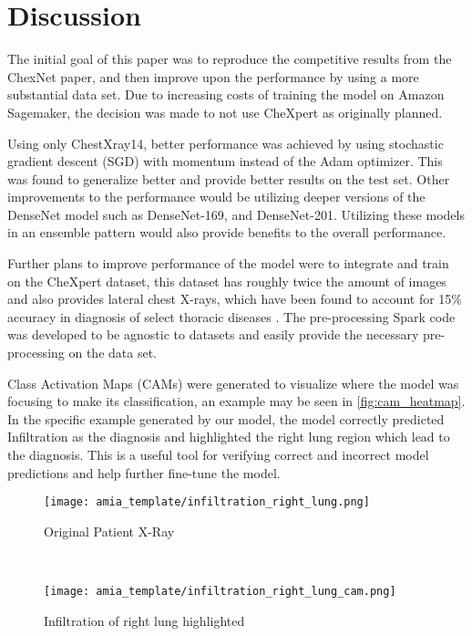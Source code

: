 \documentclass{amia}
\begin{document}
\section*{Discussion}

The initial goal of this paper was to reproduce the competitive results from the ChexNet paper, and then improve upon the performance by using a more substantial data set. Due to increasing costs of training the model on Amazon Sagemaker, the decision was made to not use CheXpert as originally planned.

Using only ChestXray14, better performance was achieved by using stochastic gradient descent (SGD) with momentum instead of the Adam optimizer. This was found to generalize better \cite{ref13} and provide better results on the test set. Other improvements to the performance would be utilizing deeper versions of the DenseNet model such as DenseNet-169, and DenseNet-201. Utilizing these models in an ensemble pattern would also provide benefits to the overall performance.

Further plans to improve performance of the model were to integrate and train on the CheXpert dataset, this dataset has roughly twice the amount of images and also provides lateral chest X-rays, which have been found to account for 15\% accuracy in diagnosis of select thoracic diseases \cite{ref10}. The pre-processing Spark code was developed to be agnostic to datasets and easily provide the necessary pre-processing on the data set.

Class Activation Maps (CAMs)\cite{ref11} were generated to visualize where the model was focusing to make its classification, an example may be seen in \ref{fig:cam_heatmap}. In the specific example generated by our model, the model correctly predicted Infiltration as the diagnosis and highlighted the right lung region which lead to the diagnosis. This is a useful tool for verifying correct and incorrect model predictions and help further fine-tune the model.
\\

\begin{figure*}[!htb]
    \centering
    \begin{subfigure}[t]{0.5\textwidth}
        \centering
        \texttt{[image: amia\_template/infiltration\_right\_lung.png]}
        \caption{Original Patient X-Ray}
    \end{subfigure}%
    ~
    \begin{subfigure}[t]{0.5\textwidth}
        \centering
        \texttt{[image: amia\_template/infiltration\_right\_lung\_cam.png]}
        \caption{Infiltration of right lung highlighted}
    \end{subfigure}
    \caption{Patient X-Ray \& CAM Heatmap}
\label{fig:cam_heatmap}
\end{figure*}
\end{document}
